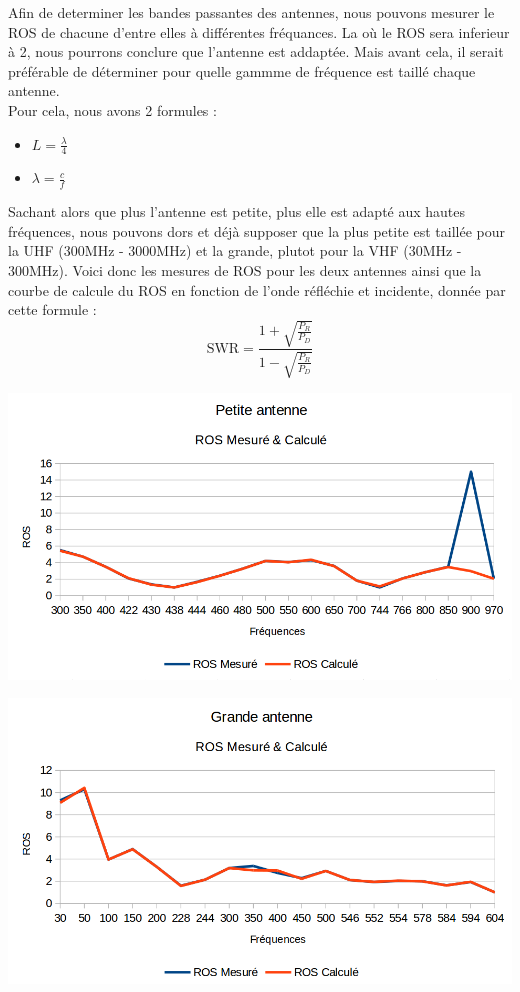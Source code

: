 \documentclass[a4paper,12pt]{report}            %
\begin{document}
Afin de determiner les bandes passantes des antennes, nous pouvons mesurer le ROS de chacune d'entre elles
à différentes fréquances. La où le ROS sera inferieur à 2, nous pourrons conclure que l'antenne est 
addaptée. Mais avant cela, il serait préférable de déterminer pour quelle gammme de fréquence est taillé chaque antenne. \\
Pour cela, nous avons 2 formules :
\begin{itemize}
	\item $L = \frac{\lambda}{4}$
	\item $\lambda = \frac{c}{f}$
\end{itemize}
Sachant alors que plus l'antenne est petite, plus elle est adapté aux hautes fréquences, nous pouvons dors et
déjà supposer que la plus petite est taillée pour la UHF (300MHz - 3000MHz) et la grande, plutot pour la
VHF (30MHz - 300MHz). Voici donc les mesures de ROS pour les deux antennes ainsi que la courbe de calcule 
du ROS en fonction de l'onde réfléchie et incidente, donnée par cette formule :
$$\mbox{SWR} = \frac{  1+ \sqrt{\frac{P_{R}}{P_{D}}  }   }{1- \sqrt{\frac{P_{R}}{P_{D}}  }}  $$

\begin{center}\includegraphics[scale = 0.5]{pic/ROS_petite_antenne.png}\\ \end{center}
\begin{center}\includegraphics[scale = 0.5]{pic/ROS_grande_antenne.png}\\ \end{center}
\end{document}
